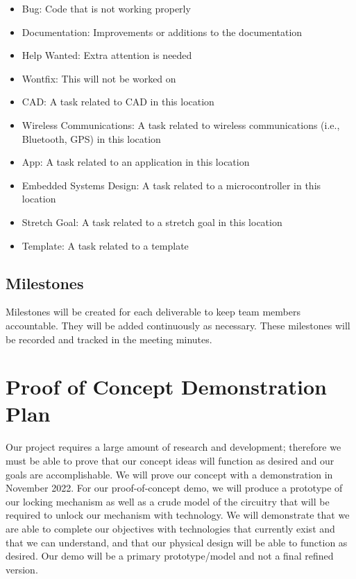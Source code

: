 \documentclass{article}
\begin{document}
\begin{itemize}

\item Bug: Code that is not working properly
\item Documentation: Improvements or additions to the documentation
\item Help Wanted: Extra attention is needed
\item Wontfix: This will not be worked on
\item CAD: A task related to CAD in this location
\item Wireless Communications: A task related to wireless communications (i.e., Bluetooth, GPS) in this location
\item App: A task related to an application in this location
\item Embedded Systems Design: A task related to a microcontroller in this location
\item Stretch Goal: A task related to a stretch goal in this location
\item Template: A task related to a template
\end{itemize}

\subsection{Milestones}

Milestones will be created for each deliverable to keep team members accountable.  They will be added continuously as necessary. These milestones will be recorded and tracked in the meeting minutes.

\section{Proof of Concept Demonstration Plan}

Our project requires a large amount of research and development; therefore we must be able to prove that our concept ideas will function as desired and our goals are accomplishable.  We will prove our concept with a demonstration in November 2022.  For our proof-of-concept demo, we will produce a prototype of our locking mechanism as well as a crude model of the circuitry that will be required to unlock our mechanism with technology.  We will demonstrate that we are able to complete our objectives with technologies that currently exist and that we can understand, and that our physical design will be able to function as desired.  Our demo will be a primary prototype/model and not a final refined version.  
\end{document}
